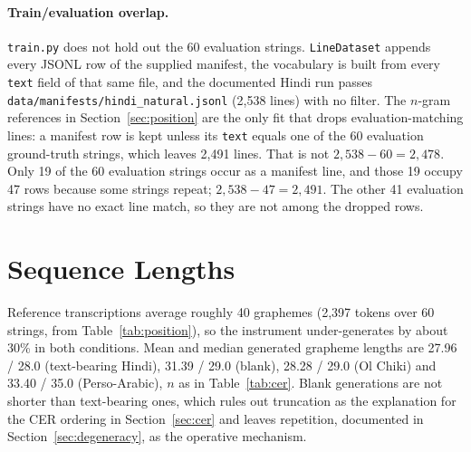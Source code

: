 \documentclass{article}
\begin{document}
\paragraph{Train/evaluation overlap.} \texttt{train.py} does not hold out the 60 evaluation
strings. \texttt{LineDataset} appends every JSONL row of the supplied manifest, the vocabulary
is built from every \texttt{text} field of that same file, and the documented Hindi run passes
\texttt{data/manifests/hindi\_natural.jsonl} (2{,}538 lines) with no filter. The $n$-gram
references in Section~\ref{sec:position} are the only fit that drops evaluation-matching lines:
a manifest row is kept unless its \texttt{text} equals one of the 60 evaluation ground-truth
strings, which leaves 2{,}491 lines. That is not $2{,}538-60=2{,}478$. Only 19 of the 60
evaluation strings occur as a manifest line, and those 19 occupy 47 rows because some strings
repeat; $2{,}538-47=2{,}491$. The other 41 evaluation strings have no exact line match, so they
are not among the dropped rows.

\section{Sequence Lengths}
\label{app:lengths}

Reference transcriptions average roughly 40 graphemes (2{,}397 tokens over 60 strings, from
Table~\ref{tab:position}), so the instrument under-generates by about 30\% in both conditions.
Mean and median generated grapheme lengths are 27.96 / 28.0 (text-bearing Hindi), 31.39 / 29.0
(blank), 28.28 / 29.0 (Ol Chiki) and 33.40 / 35.0 (Perso-Arabic), $n$ as in
Table~\ref{tab:cer}. Blank generations are not shorter than text-bearing ones, which rules out
truncation as the explanation for the CER ordering in Section~\ref{sec:cer} and leaves
repetition, documented in Section~\ref{sec:degeneracy}, as the operative mechanism.
\end{document}
